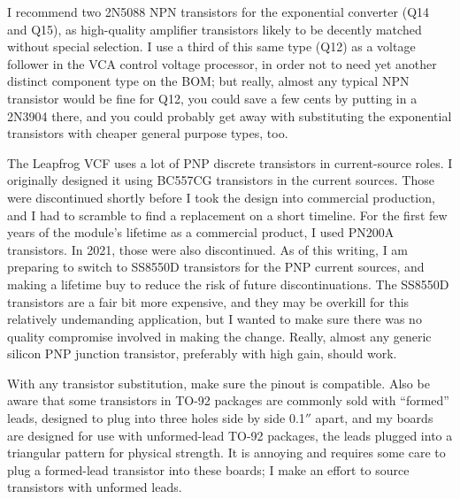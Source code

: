 I recommend two 2N5088 NPN transistors for the exponential converter (Q14
and Q15), as high-quality amplifier transistors likely to be decently
matched without special selection.  I use a third of this same type (Q12) as
a voltage follower in the VCA control voltage processor, in order not to
need yet another distinct component type on the BOM; but really, almost any
typical NPN transistor would be fine for Q12, you could save a few cents by
putting in a 2N3904 there, and you could probably get away with substituting
the exponential transistors with cheaper general purpose types, too.

The Leapfrog VCF uses a lot of PNP discrete transistors in current-source
roles.  I originally designed it using BC557CG transistors in the current
sources.  Those were discontinued shortly before I took the design into
commercial production, and I had to scramble to find a replacement on a
short timeline.  For the first few years of the module's lifetime as a
commercial product, I used PN200A transistors.  In 2021, those were also
discontinued.  As of this writing, I am preparing to switch to SS8550D
transistors for the PNP current sources, and making a lifetime buy to reduce
the risk of future discontinuations.  The SS8550D transistors are a fair
bit more expensive, and they may be overkill for this relatively undemanding
application, but I wanted to make sure there was no quality compromise
involved in making the change.  Really, almost any generic silicon PNP
junction transistor, preferably with high gain, should work.

With any transistor substitution, make sure the pinout is compatible.  Also
be aware that some transistors in TO-92 packages are commonly sold with
``formed'' leads, designed to plug into three holes side by side 0.1$''$
apart, and my boards are designed for use with unformed-lead TO-92 packages,
the leads plugged into a triangular pattern for physical strength.  It is
annoying and requires some care to plug a formed-lead transistor into these
boards; I make an effort to source transistors with unformed leads.

